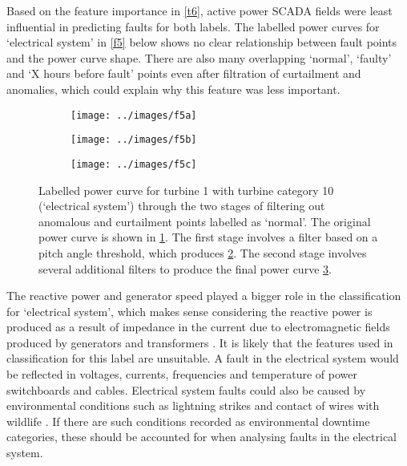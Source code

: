 Based on the feature importance in \autoref{t6}, active power SCADA fields were least influential in predicting faults for both labels. The labelled power curves for `electrical system' in \autoref{f5} below shows no clear relationship between fault points and the power curve shape. There are also many overlapping `normal', `faulty' and `X hours before fault' points even after filtration of curtailment and anomalies, which could explain why this feature was less important.

\begin{figure}
  \centering
  \begin{subfigure}[t]{.5\textwidth}
    \centering
    \texttt{[image: ../images/f5a]}
    \caption{\label{f5a}}
  \end{subfigure}%
  \begin{subfigure}[t]{.5\textwidth}
    \centering
    \texttt{[image: ../images/f5b]}
    \caption{\label{f5b}}
  \end{subfigure}
  \begin{subfigure}[t]{.5\textwidth}
    \centering
    \texttt{[image: ../images/f5c]}
    \caption{\label{f5c}}
  \end{subfigure}
  \caption{\label{f5}Labelled power curve for turbine 1 with turbine category 10 (`electrical system') through the two stages of filtering out anomalous and curtailment points labelled as `normal'. The original power curve is shown in \ref{f5a}. The first stage involves a filter based on a pitch angle threshold, which produces \ref{f5b}. The second stage involves several additional filters to produce the final power curve \ref{f5c}.}
\end{figure}

The reactive power and generator speed played a bigger role in the classification for `electrical system', which makes sense considering the reactive power is produced as a result of impedance in the current due to electromagnetic fields produced by generators and transformers \cite{React}. It is likely that the features used in classification for this label are unsuitable. A fault in the electrical system would be reflected in voltages, currents, frequencies \cite{Overb} and temperature of power switchboards and cables. Electrical system faults could also be caused by environmental conditions such as lightning strikes and contact of wires with wildlife \cite{Overb}. If there are such conditions recorded as environmental downtime categories, these should be accounted for when analysing faults in the electrical system.

